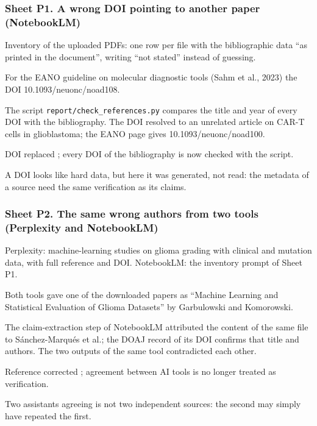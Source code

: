 \subsubsection*{Sheet P1. A wrong DOI pointing to another paper (NotebookLM)}
\begin{description}[style=nextline, leftmargin=1.2em]
  \item[Prompt] Inventory of the uploaded PDFs: one row per file with the bibliographic data ``as printed
        in the document'', writing ``not stated'' instead of guessing.
  \item[Faulty response] For the EANO guideline on molecular diagnostic tools (Sahm et al., 2023) the
        DOI 10.1093/neuonc/noad108.
  \item[Proof] The script \texttt{report/\allowbreak{}check\_\allowbreak{}references.\allowbreak{}py} compares the title and year of every DOI
        with the bibliography. The DOI resolved to an unrelated article on CAR-T cells in
        glioblastoma; the EANO page gives 10.1093/neuonc/noad100.
  \item[Correction] DOI replaced \cite{sahm2023}; every DOI of the bibliography is now checked with the
        script.
  \item[Reproduction] 
  \item[Reflection] A DOI looks like hard data, but here it was generated, not read: the metadata of a
        source need the same verification as its claims.
\end{description}

\subsubsection*{Sheet P2. The same wrong authors from two tools (Perplexity and NotebookLM)}
\begin{description}[style=nextline, leftmargin=1.2em]
  \item[Prompt] Perplexity: machine-learning studies on glioma grading with clinical and mutation data,
        with full reference and DOI. NotebookLM: the inventory prompt of Sheet P1.
  \item[Faulty response] Both tools gave one of the downloaded papers as ``Machine Learning and
        Statistical Evaluation of Glioma Datasets'' by Garbulowski and Komorowski.
  \item[Proof] The claim-extraction step of NotebookLM attributed the content of the same file to
        Sánchez-Marqués et al.; the DOAJ record of its DOI confirms that title and authors. The two outputs of the same tool contradicted each other.
  \item[Correction] Reference corrected \cite{sanchezmarques2024}; agreement between AI tools is no
        longer treated as verification.
  \item[Reproduction] 
  \item[Reflection] Two assistants agreeing is not two independent sources: the second may simply have
        repeated the first.
\end{description}

